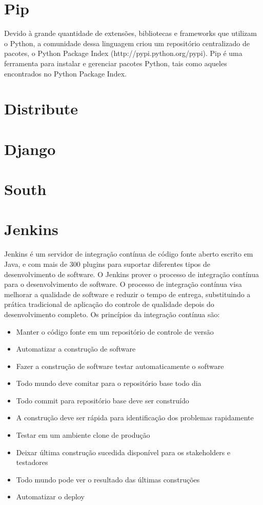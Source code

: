 \documentclass{abnt}
\begin{document}
	\section{Pip}
	
		Devido à grande quantidade de extensões, bibliotecas e frameworks que utilizam o Python, a comunidade dessa linguagem criou um repositório centralizado de pacotes, o Python Package Index (http://pypi.python.org/pypi).
		Pip é uma ferramenta para instalar e gerenciar pacotes Python, tais como aqueles encontrados no Python Package Index.\cite{PIPSITE}
	\section{Distribute}
	\section{Django}
	
	
	\section{South}
	\section{Jenkins}
			
				Jenkins é um servidor de integração contínua de código fonte aberto escrito em Java, e com mais de 300 plugins para
				suportar diferentes tipos de desenvolvimento de software. O Jenkins prover o processo de integração contínua para o
				desenvolvimento de software.
				O processo de integração contínua visa melhorar a qualidade de software e reduzir o tempo de entrega, substituindo a
				prática tradicional de aplicação do controle de qualidade depois do desenvolvimento completo. Os princípios da
				integração contínua são:
				\begin{itemize}
				  \item Manter o código fonte em um repositório de controle de versão
				  \item Automatizar a construção de software
				  \item Fazer a construção de software testar automaticamente o software
				  \item Todo mundo deve comitar para o repositório base todo dia
				  \item Todo commit para repositório base deve ser construído
				  \item A construção deve ser rápida para identificação dos problemas rapidamente
				  \item Testar em um ambiente clone de produção
				  \item Deixar última construção sucedida disponível para os stakeholders e testadores
				  \item Todo mundo pode ver o resultado das últimas construções
				  \item Automatizar o deploy
				\end{itemize}
				
\end{document}

